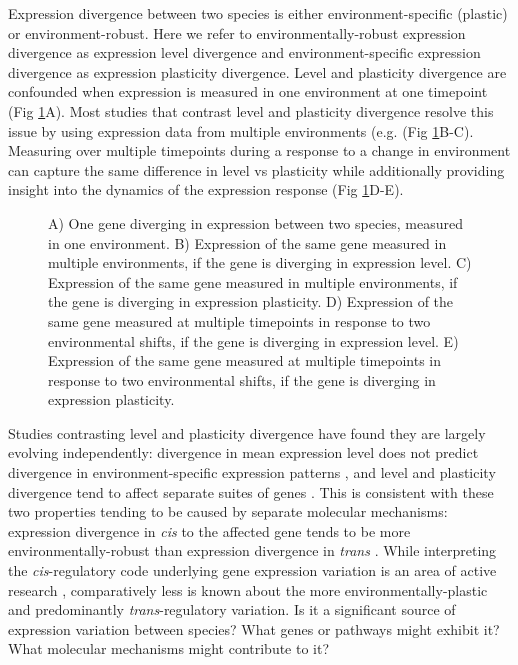 Expression divergence between two species is either environment-specific (plastic) or environment-robust. Here we refer to environmentally-robust expression divergence as expression level divergence and environment-specific expression divergence as expression plasticity divergence. Level and plasticity divergence are confounded when expression is measured in one environment at one timepoint (Fig \ref{fig:conjectogram}A). Most studies that contrast level and plasticity divergence resolve this issue by using expression data from multiple environments (e.g. \cite{Dayan2015, Ghalambor2015, Ballinger2023} (Fig \ref{fig:conjectogram}B-C). Measuring over multiple timepoints during a response to a change in environment can capture the same difference in level vs plasticity while additionally providing insight into the dynamics of the expression response (Fig \ref{fig:conjectogram}D-E).

\begin{figure}
    \centering
    \caption{A) One gene diverging in expression between two species, measured in one environment. B) Expression of the same gene measured in multiple environments, if the gene is diverging in expression level. C) Expression of the same gene measured in multiple environments, if the gene is diverging in expression plasticity. D) Expression of the same gene measured at multiple timepoints in response to two environmental shifts, if the gene is diverging in expression level. E) Expression of the same gene measured at multiple timepoints in response to two environmental shifts, if the gene is diverging in expression plasticity.}
    \label{fig:conjectogram}
\end{figure}

Studies contrasting level and plasticity divergence have found they are largely evolving independently: divergence in mean expression level does not predict divergence in environment-specific expression patterns \cite{Krieger2020}, and level and plasticity divergence tend to affect separate suites of genes \cite{Dayan2015}. This is consistent with these two properties tending to be caused by separate molecular mechanisms: expression divergence in \textit{cis} to the affected gene tends to be more environmentally-robust than expression divergence in \textit{trans} \cite{Tirosh2009, Krieger2020}. While interpreting the \textit{cis}-regulatory code underlying gene expression variation is an area of active research \cite{DeBoer2020, Avsec2021}, comparatively less is known about the more environmentally-plastic and predominantly \textit{trans}-regulatory variation. Is it a significant source of expression variation between species? What genes or pathways might exhibit it? What molecular mechanisms might contribute to it?

